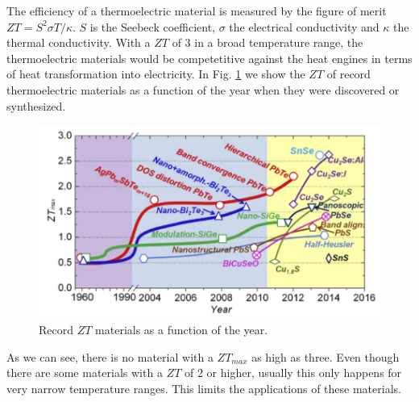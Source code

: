 The efficiency of a thermoelectric material is measured by the figure of merit $ZT=S^{2}\sigma T/\kappa$. $S$ is the
Seebeck coefficient, $\sigma$ the electrical conductivity and $\kappa$ the thermal conductivity. With a $ZT$ of 3 
in a broad temperature range, the thermoelectric materials would be competetitive against the heat engines in terms of
heat transformation into electricity. In Fig. \ref{ztvst} we show the $ZT$ of record thermoelectric materials as a 
function of the year when they were discovered or synthesized.
\begin{figure}[h]
\begin{center}
\includegraphics[width=0.9\linewidth]{Figures/ztvstemp.png}
\caption[Record $ZT$ materials]{Record $ZT$ materials as a function of the year.}
\label{ztvst}
\end{center}
\end{figure}
As we can see, there is no material with a $ZT_{max}$ as high as three. Even though there are some materials with a 
$ZT$ of 2 or higher, usually this only happens for very narrow temperature ranges. This limits the applications of 
these materials. \\

